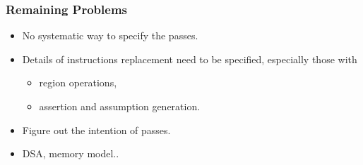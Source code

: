 \documentclass[11pt]{beamer}
\begin{document}
\begin{frame}\frametitle{Remaining Problems}

\begin{itemize}
\item No systematic way to specify the passes.
\item Details of instructions replacement need to be specified, especially those with 
\begin{itemize}
\item region operations,
\item assertion and assumption generation.
\end{itemize}
\item Figure out the intention of passes.
\item DSA, memory model..
\end{itemize}

\end{frame}
\end{document}
